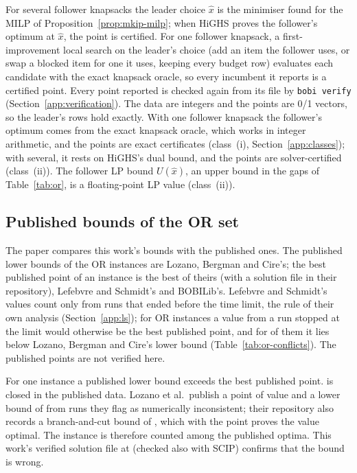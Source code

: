 For several follower knapsacks the leader choice $\hat x$ is the minimiser
found for the MILP of Proposition~\ref{prop:mkip-milp}; when HiGHS proves the
follower's optimum at $\hat x$, the point is certified. For one follower
knapsack, a first-improvement local search on the leader's choice (add an
item the follower uses, or swap a blocked item for one it uses, keeping
every budget row) evaluates each candidate with the exact knapsack oracle, so
every incumbent it reports is a certified point. Every point reported is
checked again from its file by \texttt{bobi verify}
(Section~\ref{app:verification}). The data are integers and the points are
0/1 vectors, so the leader's rows hold exactly. With one follower knapsack the
follower's optimum comes from the exact knapsack oracle, which works in
integer arithmetic, and the \NumOrOneKnapsackPoints{} points are exact
certificates (class~(i), Section~\ref{app:classes}); with several, it rests on
HiGHS's dual bound, and the \NumOrSeveralPoints{} points are solver-certified
(class~(ii)). The follower LP bound $U(\hat x)$, an upper bound in the gaps of
Table~\ref{tab:or}, is a floating-point LP value (class~(ii)).

\subsection{Published bounds of the OR set}\label{app:mkip-or}

The paper compares this work's bounds with the published ones. The published
lower bounds of the OR instances are Lozano, Bergman and
Cire's;\cite{lozano2026network} the best published point of an instance is the
best of theirs (with a solution file in their repository\cite{lozano_dbo_repo}),
Lefebvre and Schmidt's\cite{lefebvre2025dantzig} and BOBILib's. Lefebvre and
Schmidt's values count only from runs that ended before the time limit, the
rule of their own analysis (Section~\ref{app:ls}); for \NumOrLsTimeLimitBest{}
OR instances a value from a run stopped at the limit would otherwise be the best
published point, and for \NumOrLsTimeLimitBelowLb{} of them it lies below Lozano,
Bergman and Cire's lower bound (Table~\ref{tab:or-conflicts}). The published
points are not verified here.

For one instance a published lower bound exceeds the best published point.
\texttt{\OrClosureName} is closed in the published data. Lozano et
al.\ publish a point of value \OrClosureValue{} and a lower bound of
\OrClosureLitLb{} from runs they flag as numerically inconsistent; their
repository also records a branch-and-cut bound of \OrClosureValue{}, which with
the point proves the value optimal. The instance is therefore counted among the
published optima. This work's verified solution file at \OrClosureValue{}
(checked also with SCIP) confirms that the bound \OrClosureLitLb{} is wrong.


